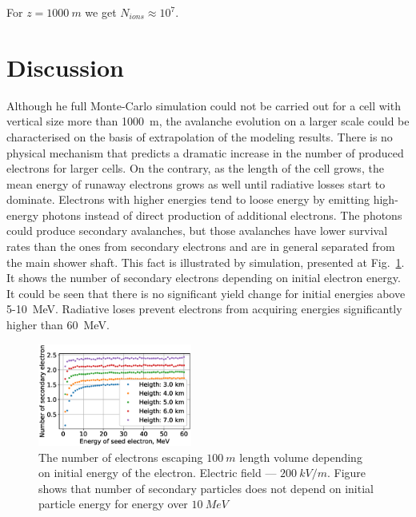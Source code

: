 \documentclass[doublecol,linenumbers]{epl2} %
\begin{document}
For $z = 1000~m$ we get $N_{ions} \approx 10^7$.

\section{Discussion}
Although he full Monte-Carlo simulation could not be carried out for a cell with vertical size more than 1000~m, the avalanche evolution on a larger scale could be characterised on the basis of extrapolation of the modeling results.
There is no physical mechanism that predicts a dramatic increase in the number of produced electrons for larger cells. On the contrary, as the length of the cell grows, the mean energy of runaway electrons grows as well until radiative losses start to dominate.
Electrons with higher energies tend to loose energy by emitting high-energy photons instead of direct production of additional electrons. The photons could produce secondary avalanches, but those avalanches have lower survival rates than the ones from secondary electrons and are in general separated from the main shower shaft. This fact is illustrated by simulation, presented at Fig.~\ref{fig:sec}. %
It shows the number of secondary electrons depending on initial electron energy. It could be seen that there is no significant yield change for initial energies above 5-10~MeV. Radiative loses prevent electrons from acquiring energies significantly higher than 60~MeV.

\begin{figure}[h]
    \centering
    \includegraphics[width=0.45\textwidth]{figures/secondary.eps}
    \caption{The number of electrons escaping $100~m$ length volume depending on initial energy of the electron. Electric field --- $200~kV/m$. Figure shows that number of secondary particles does not depend on initial particle energy for energy over $10~MeV$}
    \label{fig:sec}
\end{figure} 
\end{document}
